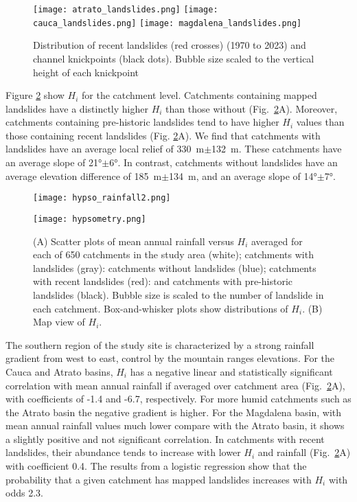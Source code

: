 \documentclass[draft]{agujournal2019}
\begin{document}
\begin{figure}[ht!]
    \centering
      {\texttt{[image: atrato\_landslides.png]}}
      {\texttt{[image: cauca\_landslides.png]}}
      {\texttt{[image: magdalena\_landslides.png]}}
    \caption{Distribution of recent landslides (red crosses) (1970 to 2023) and channel knickpoints (black dots). Bubble size scaled to the vertical height of each knickpoint}
    \label{fig:elevationKnickpoints}
\end{figure}

\par Figure \ref{fig:hypso} show $H_i$ for the catchment level. Catchments containing mapped landslides have a distinctly higher $H_i$ than those without (Fig.~\ref{fig:hypso}A). Moreover, catchments containing pre-historic landslides tend to have higher $H_i$ values than those containing recent landslides (Fig. \ref{fig:hypso}A). We find that catchments with landslides have an average local relief of 330~m$\pm$132~m. These catchments have an average slope of 21°$\pm$6°. In contrast, catchments without landslides have an average elevation difference of 185~m$\pm$134~m, and an average slope of 14°$\pm$7°.

\begin{figure}[ht!]
  \begin{minipage}{.48\linewidth}
    \centering
    {\texttt{[image: hypso\_rainfall2.png]}}
   \end{minipage}\quad
   \begin{minipage}{.48\linewidth}
    \centering
      {\texttt{[image: hypsometry.png]}}
  \end{minipage}
    \caption{(A) Scatter plots of mean annual rainfall versus $H_i$ averaged for each of 650 catchments in the study area (white); catchments with landslides (gray): catchments without landslides (blue); catchments with recent landslides (red): and catchments with pre-historic landslides (black). Bubble size is scaled to the number of landslide in each catchment. Box-and-whisker plots show distributions of $H_i$. (B) Map view of $H_i$.}
    \label{fig:hypso}
\end{figure}

\par The southern region of the study site is characterized by a strong rainfall gradient from west to east, control by the mountain ranges elevations. For the Cauca and Atrato basins, $H_i$ has a negative linear and statistically significant correlation with mean annual rainfall if averaged over catchment area (Fig.~\ref{fig:hypso}A), with coefficients of -1.4 and -6.7, respectively. For more humid catchments such as the Atrato basin the negative gradient is higher. For the Magdalena basin, with mean annual rainfall values much lower compare with the Atrato basin, it shows a slightly positive and not significant correlation. In catchments with recent landslides, their abundance tends to increase with lower $H_i$ and rainfall (Fig.~\ref{fig:hypso}A) with coefficient 0.4. The results from a logistic regression show that the probability that a given catchment has mapped landslides increases with $H_i$ with odds 2.3.
\end{document}
